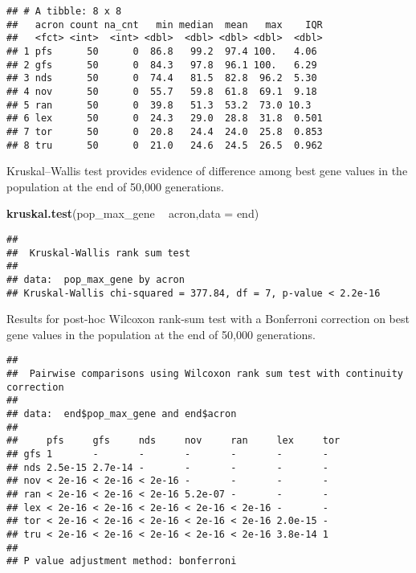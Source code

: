 \documentclass[]{book}
\newenvironment{Shaded}{\begin{snugshade}}{\end{snugshade}}
\newcommand{\DataTypeTok}[1]{\textcolor[rgb]{0.13,0.29,0.53}{#1}}
\newcommand{\KeywordTok}[1]{\textcolor[rgb]{0.13,0.29,0.53}{\textbf{#1}}}
\newcommand{\NormalTok}[1]{#1}
\newcommand{\OperatorTok}[1]{\textcolor[rgb]{0.81,0.36,0.00}{\textbf{#1}}}
\newcommand{\OtherTok}[1]{\textcolor[rgb]{0.56,0.35,0.01}{#1}}
\newcommand{\StringTok}[1]{\textcolor[rgb]{0.31,0.60,0.02}{#1}}
\begin{document}
\begin{verbatim}
## # A tibble: 8 x 8
##   acron count na_cnt   min median  mean   max    IQR
##   <fct> <int>  <int> <dbl>  <dbl> <dbl> <dbl>  <dbl>
## 1 pfs      50      0  86.8   99.2  97.4 100.   4.06 
## 2 gfs      50      0  84.3   97.8  96.1 100.   6.29 
## 3 nds      50      0  74.4   81.5  82.8  96.2  5.30 
## 4 nov      50      0  55.7   59.8  61.8  69.1  9.18 
## 5 ran      50      0  39.8   51.3  53.2  73.0 10.3  
## 6 lex      50      0  24.3   29.0  28.8  31.8  0.501
## 7 tor      50      0  20.8   24.4  24.0  25.8  0.853
## 8 tru      50      0  21.0   24.6  24.5  26.5  0.962
\end{verbatim}

Kruskal--Wallis test provides evidence of difference among best gene values in the population at the end of 50,000 generations.

\begin{Shaded}
\begin{Highlighting}[]
\KeywordTok{kruskal.test}\NormalTok{(pop_max_gene }\OperatorTok{~}\StringTok{ }\NormalTok{acron,}\DataTypeTok{data =}\NormalTok{ end)}
\end{Highlighting}
\end{Shaded}

\begin{verbatim}
## 
##  Kruskal-Wallis rank sum test
## 
## data:  pop_max_gene by acron
## Kruskal-Wallis chi-squared = 377.84, df = 7, p-value < 2.2e-16
\end{verbatim}

Results for post-hoc Wilcoxon rank-sum test with a Bonferroni correction on best gene values in the population at the end of 50,000 generations.

\begin{Shaded}
\end{Shaded}

\begin{verbatim}
## 
##  Pairwise comparisons using Wilcoxon rank sum test with continuity correction 
## 
## data:  end$pop_max_gene and end$acron 
## 
##     pfs     gfs     nds     nov     ran     lex     tor
## gfs 1       -       -       -       -       -       -  
## nds 2.5e-15 2.7e-14 -       -       -       -       -  
## nov < 2e-16 < 2e-16 < 2e-16 -       -       -       -  
## ran < 2e-16 < 2e-16 < 2e-16 5.2e-07 -       -       -  
## lex < 2e-16 < 2e-16 < 2e-16 < 2e-16 < 2e-16 -       -  
## tor < 2e-16 < 2e-16 < 2e-16 < 2e-16 < 2e-16 2.0e-15 -  
## tru < 2e-16 < 2e-16 < 2e-16 < 2e-16 < 2e-16 3.8e-14 1  
## 
## P value adjustment method: bonferroni
\end{verbatim}
\end{document}
